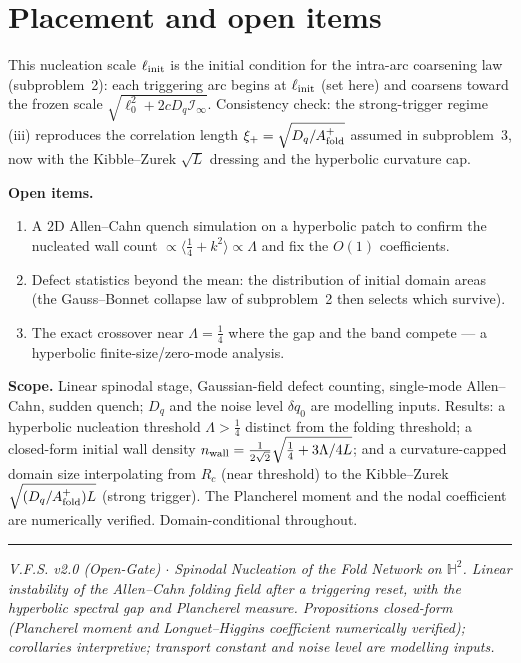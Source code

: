 \documentclass[11pt,a4paper,oneside]{book}
\newcommand{\Af}{A_{\rm fold}}
\newcommand{\Hh}{\mathbb{H}^2}
\newcommand{\Dq}{D_q}
\newcommand{\Lam}{\Lambda}
\newcommand{\Rc}{R_c}
\theoremstyle{plain}
\theoremstyle{definition}
\theoremstyle{remark}
\begin{document}
\section{Placement and open items}

This nucleation scale $\ell_{\rm init}$ is the initial condition for the intra-arc coarsening law
(subproblem~2): each triggering arc begins at $\ell_{\rm init}$ (set here) and coarsens toward the frozen
scale $\sqrt{\ell_0^2+2c\Dq\mathcal I_\infty}$. Consistency check: the strong-trigger regime (iii)
reproduces the correlation length $\xi_+=\sqrt{\Dq/\Af^+}$ assumed in subproblem~3, now with the
Kibble--Zurek $\sqrt{L}$ dressing and the hyperbolic curvature cap.

\textbf{Open items.}
\begin{enumerate}[leftmargin=1.6em,itemsep=2pt]
\item A $2$D Allen--Cahn quench simulation on a hyperbolic patch to confirm the nucleated wall count
$\propto\langle\tfrac14+k^2\rangle\propto\Lam$ and fix the $O(1)$ coefficients.
\item Defect statistics beyond the mean: the distribution of initial domain areas (the Gauss--Bonnet
collapse law of subproblem~2 then selects which survive).
\item The exact crossover near $\Lam=\tfrac14$ where the gap and the band compete --- a hyperbolic
finite-size/zero-mode analysis.
\end{enumerate}

\textbf{Scope.} Linear spinodal stage, Gaussian-field defect counting, single-mode Allen--Cahn, sudden
quench; $\Dq$ and the noise level $\delta q_0$ are modelling inputs. Results: a hyperbolic nucleation
threshold $\Lam>\tfrac14$ distinct from the folding threshold; a closed-form initial wall density
$n_{\rm wall}=\tfrac{1}{2\sqrt2}\sqrt{\tfrac14+3\Lam/4L}$; and a curvature-capped domain size interpolating
from $\Rc$ (near threshold) to the Kibble--Zurek $\sqrt{(\Dq/\Af^+)L}$ (strong trigger). The Plancherel
moment and the nodal coefficient are numerically verified. Domain-conditional throughout.

\vspace{0.5em}
\hrule
\smallskip
\noindent\footnotesize\emph{V.F.S. v2.0 (Open-Gate) $\cdot$ Spinodal Nucleation of the Fold Network on
$\Hh$. Linear instability of the Allen--Cahn folding field after a triggering reset, with the hyperbolic
spectral gap and Plancherel measure. Propositions closed-form (Plancherel moment and Longuet--Higgins
coefficient numerically verified); corollaries interpretive; transport constant and noise level are
modelling inputs.}
\end{document}
